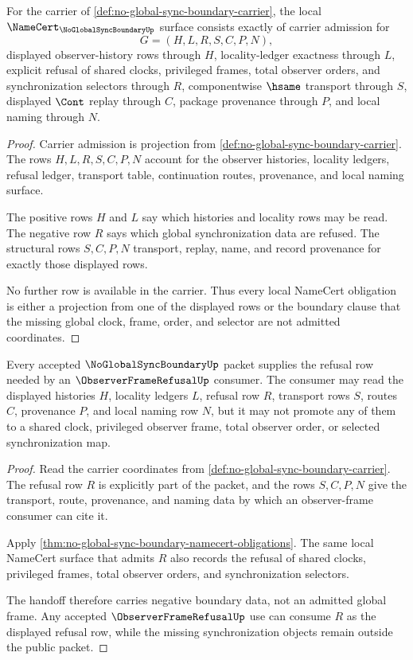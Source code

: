\begin{theorem}
\label{thm:no-global-sync-boundary-namecert-obligations}
For the carrier of \autoref{def:no-global-sync-boundary-carrier}, the local $\NameCert_{\NoGlobalSyncBoundaryUp}$ surface consists exactly of carrier admission for
$$
G=(H,L,R,S,C,P,N),
$$
displayed observer-history rows through $H$, locality-ledger exactness through $L$, explicit refusal of shared clocks, privileged frames, total observer orders, and synchronization selectors through $R$, componentwise $\hsame$ transport through $S$, displayed $\Cont$ replay through $C$, package provenance through $P$, and local naming through $N$.
\end{theorem}
\begin{proof}
Carrier admission is projection from \autoref{def:no-global-sync-boundary-carrier}. The rows $H,L,R,S,C,P,N$ account for the observer histories, locality ledgers, refusal ledger, transport table, continuation routes, provenance, and local naming surface.

The positive rows $H$ and $L$ say which histories and locality rows may be read. The negative row $R$ says which global synchronization data are refused. The structural rows $S,C,P,N$ transport, replay, name, and record provenance for exactly those displayed rows.

No further row is available in the carrier. Thus every local NameCert obligation is either a projection from one of the displayed rows or the boundary clause that the missing global clock, frame, order, and selector are not admitted coordinates.
\end{proof}

\begin{theorem}
\label{thm:no-global-sync-boundary-frame-refusal-handoff}
Every accepted $\NoGlobalSyncBoundaryUp$ packet supplies the refusal row needed by an $\ObserverFrameRefusalUp$ consumer. The consumer may read the displayed histories $H$, locality ledgers $L$, refusal row $R$, transport rows $S$, routes $C$, provenance $P$, and local naming row $N$, but it may not promote any of them to a shared clock, privileged observer frame, total observer order, or selected synchronization map.
\end{theorem}
\begin{proof}
Read the carrier coordinates from \autoref{def:no-global-sync-boundary-carrier}. The refusal row $R$ is explicitly part of the packet, and the rows $S,C,P,N$ give the transport, route, provenance, and naming data by which an observer-frame consumer can cite it.

Apply \autoref{thm:no-global-sync-boundary-namecert-obligations}. The same local NameCert surface that admits $R$ also records the refusal of shared clocks, privileged frames, total observer orders, and synchronization selectors.

The handoff therefore carries negative boundary data, not an admitted global frame. Any accepted $\ObserverFrameRefusalUp$ use can consume $R$ as the displayed refusal row, while the missing synchronization objects remain outside the public packet.
\end{proof}

